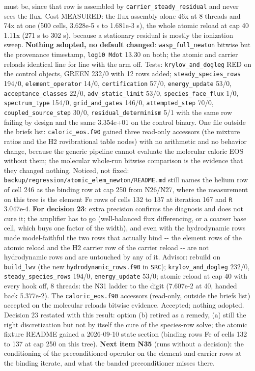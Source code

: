 \documentclass[english,a4paper]{my_memo}
\begin{document}
\begin{itemize}
  must be, since that row is assembled by \texttt{carrier\_steady\_residual} and
  never sees the flux. Cost MEASURED: the flux assembly alone 46x at 8
  threads and 74x at one (500 cells, 3.628e-5 s to 1.681e-3 s), the whole
  atomic reload at cap 40 1.11x (271 s to 302 s), because a stationary
  residual is mostly the ionization sweep. \textbf{Nothing adopted, no default
  changed}: \texttt{wasp\_full\_newton} bitwise but the provenance timestamp,
  \texttt{log10\ Mdot} 13.30 on both; the atomic and carrier reloads identical
  line for line with the arm off. Tests: \texttt{krylov\_and\_dogleg} RED on the
  control objects, GREEN 232/0 with 12 rows added; \texttt{steady\_species\_rows}
  194/0, \texttt{element\_operator} 14/0, \texttt{certification} 57/0, \texttt{energy\_update}
  53/0, \texttt{acceptance\_classes} 22/0, \texttt{adv\_static\_limit} 53/0,
  \texttt{species\_face\_flux} 1/0, \texttt{spectrum\_type} 154/0, \texttt{grid\_and\_gates} 146/0,
  \texttt{attempted\_step} 70/0, \texttt{coupled\_source\_step} 30/0,
  \texttt{residual\_determinism} 5/1 with the same row failing by design and the
  same 3.354e+01 on the control binary. One file outside the brief\textquotesingle s list:
  \texttt{caloric\_eos.f90} gained three read-only accessors (the mixture ratios
  and the H2 rovibrational table nodes) with no arithmetic and no behavior
  change, because the generic pipeline cannot evaluate the molecular
  caloric EOS without them; the molecular whole-run bitwise comparison is
  the evidence that they changed nothing. Noticed, not fixed:
  \texttt{backup/regression/atomic\_elem\_newton/README.md} still names the helium
  row of cell 246 as the binding row at cap 250 from N26/N27, where the
  measurement on this tree is the element Fe rows of cells 132 to 137 at
  iteration 167 and \texttt{\textbar{}\textbar{}R\textbar{}\textbar{}} 3.047e-4. \textbf{For decision 23}: extra precision
  confirms the diagnosis and does not cure it; the amplifier has to go
  (well-balanced flux differencing, or a coarser base cell, which buys one
  factor of the width), and even with the hydrodynamic rows made
  model-faithful the two rows that actually bind -\/- the element rows of the
  atomic reload and the H2 carrier row of the carrier reload -\/- are not
  hydrodynamic rows and are untouched by any of it. Advisor: rebuild on \texttt{build\_lwv} (the new \texttt{hydrodynamic\_rows.f90} in \texttt{SRC}); \texttt{krylov\_and\_dogleg} 232/0, \texttt{steady\_species\_rows} 194/0, \texttt{energy\_update} 53/0; atomic reload at cap 40 with every hook off, 8 threads: the N31 ladder to the digit (7.607e-2 at 40, handed back 5.377e-2). The \texttt{caloric\_eos.f90} accessors (read-only, outside the brief\textquotesingle s list) accepted on the molecular reload\textquotesingle s bitwise evidence. Accepted; nothing adopted. Decision 23 restated with this result: option (b) retired as a remedy, (a) still the right discretization but not by itself the cure of the species-row solve; the atomic fixture README gained a 2026-09-10 state section (binding rows Fe of cells 132 to 137 at cap 250 on this tree). \textbf{Next item N35} (runs without a decision): the conditioning of the preconditioned operator on the element and carrier rows at the binding iterate, and what the banded preconditioner misses there.

\end{itemize}
\end{document}
